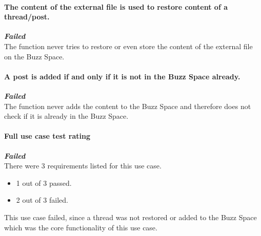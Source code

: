 \paragraph{\color{black}The content of the external file is used to restore content of a thread/post.\\}
\color{red}
\textbf{\small \emph{Failed}} \\
\color{black}The function never tries to restore or even store the content of the external file on the Buzz Space.
\par

\paragraph{\color{black}A post is added if and only if it is not in the Buzz Space already.\\}
\color{red}
\textbf{\small \emph{Failed}} \\
\color{black}The function never adds the content to the Buzz Space and therefore does not check if it is already in the Buzz Space. 
\par

\paragraph{\color{black} Full use case test rating\\}
\color{red}
\textbf{\small \emph{Failed}} \\
\color{black}
There were 3 requirements listed for this use case. 
\begin{itemize}
	\item{1 out of 3 passed.} 
	\item{2 out of 3 failed.}
\end{itemize}
This use case failed, since a thread was not restored or added to the Buzz Space which was the core functionality of this use case.
\par